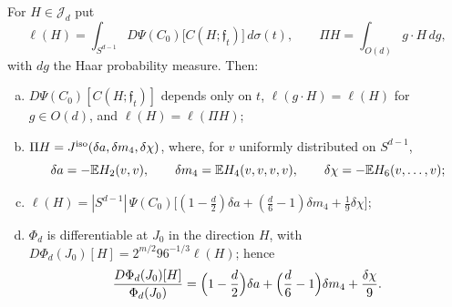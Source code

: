 \begin{lemma}\label{lem:correction-haar}
For $H\in\mathcal J_d$ put
\[
\ell(H)=\int_{S^{d-1}}D\Psi(C_0)\bigl[C(H;\mathfrak f_t)\bigr]\,d\sigma(t),\qquad \Pi H=\int_{O(d)}g\cdot H\,dg,
\]
with $dg$ the Haar probability measure. Then:
\begin{enumerate}[(a)]
\item $D\Psi(C_0)[C(H;\mathfrak f_t)]$ depends only on $t$, $\ell(g\cdot H)=\ell(H)$ for $g\in O(d)$, and $\ell(H)=\ell(\Pi H)$;
\item $\Pi H=J^{\rm iso}(\delta a,\delta m_4,\delta\chi)$, where, for $v$ uniformly distributed on $S^{d-1}$,
\[
\delta a=-\mathbb E H_2(v,v),\qquad \delta m_4=\mathbb E H_4(v,v,v,v),\qquad \delta\chi=-\mathbb E H_6(v,\dots,v);
\]
\item $\ell(H)=|S^{d-1}|\,\Psi(C_0)\bigl[(1-\frac d2)\delta a+(\frac d6-1)\delta m_4+\frac19\delta\chi\bigr]$;
\item $\Phi_d$ is differentiable at $J_0$ in the direction $H$, with $D\Phi_d(J_0)[H]=2^{m/2}96^{-1/3}\ell(H)$; hence
\begin{equation}\label{eq:correction-haarvar}
\frac{D\Phi_d(J_0)[H]}{\Phi_d(J_0)}=\Bigl(1-\frac d2\Bigr)\delta a+\Bigl(\frac d6-1\Bigr)\delta m_4+\frac{\delta\chi}9 .
\end{equation}
\end{enumerate}
\end{lemma}

